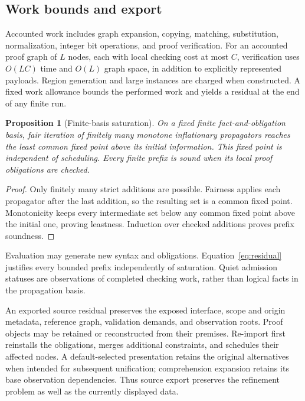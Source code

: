 \documentclass[10pt,a4paper]{article}
\newtheorem{proposition}[definition]{Proposition}
\theoremstyle{remark}
\begin{document}
\subsection{Work bounds and export}
Accounted work includes graph expansion, copying, matching, substitution,
normalization, integer bit operations, and proof verification. For an accounted
proof graph of $L$ nodes, each with local checking cost at most $C$, verification
uses $O(LC)$ time and $O(L)$ graph space, in addition to explicitly represented
payloads. Region generation and large instances are charged when constructed.
A fixed work allowance bounds the performed work and yields a residual at the
end of any finite run.

\begin{proposition}[Finite-basis saturation]\label{prop:saturation}
On a fixed finite fact-and-obligation basis, fair iteration of finitely many
monotone inflationary propagators reaches the least common fixed point above
its initial information. This fixed point is independent of scheduling. Every
finite prefix is sound when its local proof obligations are checked.
\end{proposition}
\begin{proof}
Only finitely many strict additions are possible. Fairness applies each
propagator after the last addition, so the resulting set is a common fixed
point. Monotonicity keeps every intermediate set below any common fixed point
above the initial one, proving leastness. Induction over checked additions
proves prefix soundness.
\end{proof}

Evaluation may generate new syntax and obligations. Equation~\eqref{eq:residual}
justifies every bounded prefix independently of saturation. Quiet admission
statuses are observations of completed checking work, rather than logical facts
in the propagation basis.

An exported source residual preserves the exposed interface, scope and origin
metadata, reference graph, validation demands, and observation roots. Proof
objects may be retained or reconstructed from their premises. Re-import first
reinstalls the obligations, merges additional constraints, and schedules their
affected nodes. A default-selected presentation retains the original alternatives
when intended for subsequent unification; comprehension expansion retains its
base observation dependencies. Thus source export preserves the refinement
problem as well as the currently displayed data.
\end{document}
